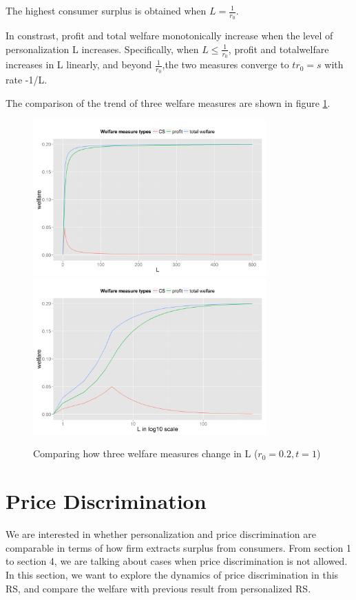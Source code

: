 \documentclass[11pt, oneside]{article}   	%
\begin{document}
The highest consumer surplus is obtained when $L = \frac{1}{r_0}$.

In constrast, profit and total welfare monotonically increase when the level of personalization L increases. Specifically, when $L \leq \frac{1}{r_0}$, profit and totalwelfare increases in L linearly, and beyond $\frac{1}{r_0}$,the two measures converge to $tr_0 = s$ with rate -1/L. 

The comparison of the trend of three welfare measures are shown in figure \ref{comp3welfare}.

\begin{figure}
\centering
\includegraphics[width = 0.8\textwidth,height=0.5\textwidth]{compare3welfare.png}
\includegraphics[width = 0.8\textwidth,height=0.5\textwidth]{compare3welfare-logscale.png}
\caption{Comparing how three welfare measures change in L ($r_0 = 0.2, t = 1$)}
\label{comp3welfare}
\end{figure}
\section{Price Discrimination}
We are interested in whether personalization and price discrimination are comparable in terms of how firm extracts surplus from consumers. From section 1 to section 4, we are talking about cases when price discrimination is not allowed. In this section, we want to explore the dynamics of price discrimination in this RS, and compare the welfare with previous result from personalized RS.
\end{document}
